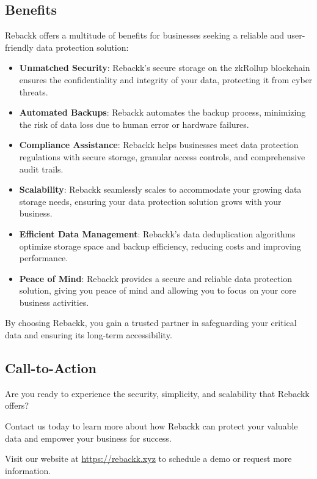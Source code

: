 \documentclass[12pt]{article}
\begin{document}
\subsection{Benefits}
Rebackk offers a multitude of benefits for businesses seeking a reliable and user-friendly data protection solution:

\begin{itemize}
    \item \textbf{Unmatched Security}: Rebackk's secure storage on the zkRollup blockchain ensures the confidentiality and integrity of your data, protecting it from cyber threats.
    \item \textbf{Automated Backups}: Rebackk automates the backup process, minimizing the risk of data loss due to human error or hardware failures.
    \item \textbf{Compliance Assistance}: Rebackk helps businesses meet data protection regulations with secure storage, granular access controls, and comprehensive audit trails.
    \item \textbf{Scalability}: Rebackk seamlessly scales to accommodate your growing data storage needs, ensuring your data protection solution grows with your business.
    \item \textbf{Efficient Data Management}: Rebackk's data deduplication algorithms optimize storage space and backup efficiency, reducing costs and improving performance.
    \item \textbf{Peace of Mind}: Rebackk provides a secure and reliable data protection solution, giving you peace of mind and allowing you to focus on your core business activities.
\end{itemize}
By choosing Rebackk, you gain a trusted partner in safeguarding your critical data and ensuring its long-term accessibility.

\subsection{Call-to-Action}
Are you ready to experience the security, simplicity, and scalability that Rebackk offers?

Contact us today to learn more about how Rebackk can protect your valuable data and empower your business for success.

Visit our website at \href{https://rebackk.xyz}{https://rebackk.xyz} to schedule a demo or request more information.
\newpage

\end{document}

